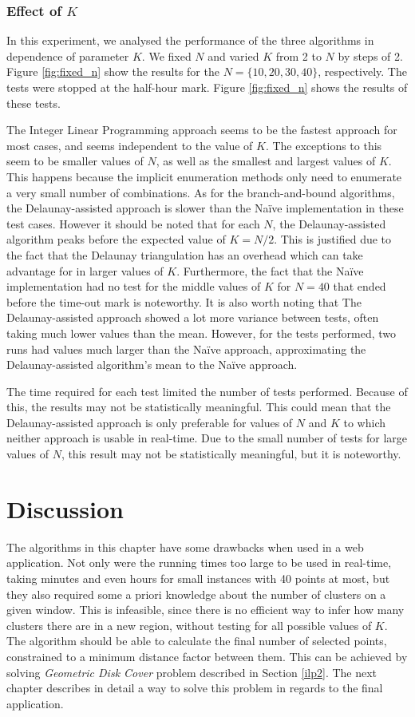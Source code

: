 \subsubsection*{Effect of $K$}
In this experiment, we analysed the performance of the three algorithms in dependence of parameter $K$. We fixed $N$ and varied $K$ from 2 to $N$ by steps of 2. Figure \ref{fig:fixed_n} show the results for the $N=\{10,20,30,40\}$, respectively. The tests were stopped at the half-hour mark. Figure \ref{fig:fixed_n} shows the results of these tests.

\noindent
The Integer Linear Programming approach seems to be the fastest approach for most cases, and seems independent to the value of $K$. The exceptions to this seem to be smaller values of $N$, as well as the smallest and largest values of $K$. This happens because the implicit enumeration methods only need to enumerate a very small number of combinations.
As for the branch-and-bound algorithms, the Delaunay-assisted approach is slower than the Naïve implementation in these test cases. However it should be noted that for each $N$, the Delaunay-assisted algorithm peaks before the expected value of $K=N/2$. This is justified due to the fact that the Delaunay triangulation has an overhead which can take advantage for in larger values of $K$.
Furthermore, the fact that the Naïve implementation had no test for the middle values of $K$ for $N=40$ that ended before the time-out mark is noteworthy.
It is also worth noting that The Delaunay-assisted approach showed a lot more variance between tests, often taking much lower values than the mean. However, for the tests performed, two runs had values much larger than the Naïve approach, approximating the Delaunay-assisted algorithm's mean to the Naïve approach.

The time required for each test limited the number of tests performed. Because of this, the results may not be statistically meaningful. 
This could mean that the Delaunay-assisted approach is only preferable for values of $N$ and $K$ to which neither approach is usable in real-time. Due to the small number of tests for large values of $N$, this result may not be statistically meaningful, but it is noteworthy.

\section{Discussion}
The algorithms in this chapter have some drawbacks when used in a web application. Not only were the running times too large to be used in real-time, taking minutes and even hours for small instances with 40 points at most, but they also required some a priori knowledge about the number of clusters on a given window. This is infeasible, since there is no efficient way to infer how many clusters there are in a new region, without testing for all possible values of $K$. The algorithm should be able to calculate the final number of selected points, constrained to a minimum distance factor between them. This can be achieved by solving \emph{Geometric Disk Cover} problem described in Section \ref{ilp2}. The next chapter describes in detail a way to solve this problem in regards to the final application.
